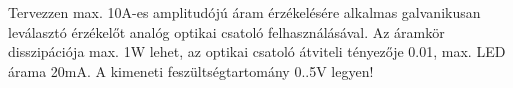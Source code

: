 \begin{example}

Tervezzen max. 10A-es amplitudójú áram érzékelésére alkalmas galvanikusan leválasztó érzékelőt analóg optikai csatoló felhasználásával. Az áramkör disszipációja max. 1W lehet, az optikai csatoló átviteli tényezője 0.01, max. LED árama 20mA. A kimeneti feszültségtartomány 0..5V legyen!


\tcbline
\vspace{1mm}

\solution

\end{example}